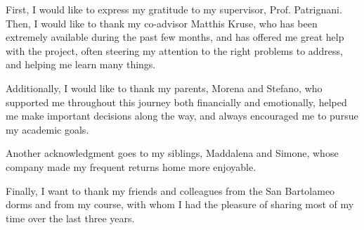 
First, I would like to express my gratitude to my supervisor, Prof. Patrignani. Then, I would like to thank my co-advisor Matthis Kruse, who has been extremely available during the past few months, and has offered me great help with the project, often steering my attention to the right problems to address, and helping me learn many things.

Additionally, I would like to thank my parents, Morena and Stefano, who supported me throughout this journey both financially and emotionally, helped me make important decisions along the way, and always encouraged me to pursue my academic goals.

Another acknowledgment goes to my siblings, Maddalena and Simone, whose company made my frequent returns home more enjoyable.

Finally, I want to thank my friends and colleagues from the San Bartolameo dorms and from my course, with whom I had the pleasure of sharing most of my time over the last three years.